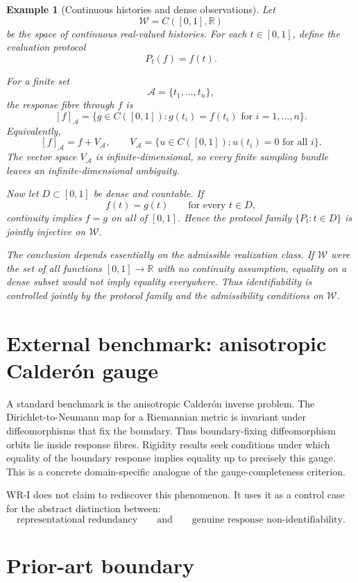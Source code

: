 \documentclass[11pt]{article}
\newtheorem{example}[definition]{Example}
\newcommand{\W}{\mathcal W}
\newcommand{\Acal}{\mathcal A}
\begin{document}
\begin{example}[Continuous histories and dense observations]
Let
\[
\W=C([0,1],\mathbb R)
\]
be the space of continuous real-valued histories.  For each $t\in[0,1]$, define
the evaluation protocol
\[
P_t(f)=f(t).
\]

For a finite set
\[
\Acal=\{t_1,\dots,t_n\},
\]
the response fibre through $f$ is
\[
[f]_{\Acal}
=
\{g\in C([0,1]):g(t_i)=f(t_i)\text{ for }i=1,\dots,n\}.
\]
Equivalently,
\[
[f]_{\Acal}
=
f+V_{\Acal},
\qquad
V_{\Acal}
=
\{u\in C([0,1]):u(t_i)=0\text{ for all }i\}.
\]
The vector space $V_{\Acal}$ is infinite-dimensional, so every finite sampling
bundle leaves an infinite-dimensional ambiguity.

Now let $D\subset[0,1]$ be dense and countable.  If
\[
f(t)=g(t)\qquad\text{for every }t\in D,
\]
continuity implies $f=g$ on all of $[0,1]$.  Hence the protocol family
$\{P_t:t\in D\}$ is jointly injective on $\W$.

The conclusion depends essentially on the admissible realization class.  If
$\W$ were the set of all functions $[0,1]\to\mathbb R$ with no continuity
assumption, equality on a dense subset would not imply equality everywhere.
Thus identifiability is controlled jointly by the protocol family and the
admissibility conditions on $\W$.
\end{example}

\section{External benchmark: anisotropic Calderón gauge}

A standard benchmark is the anisotropic Calderón inverse problem.  The
Dirichlet-to-Neumann map for a Riemannian metric is invariant under
diffeomorphisms that fix the boundary.  Thus boundary-fixing diffeomorphism
orbits lie inside response fibres.  Rigidity results seek conditions under which
equality of the boundary response implies equality up to precisely this gauge.
This is a concrete domain-specific analogue of the gauge-completeness criterion.

WR-I does not claim to rediscover this phenomenon.  It uses it as a control case
for the abstract distinction between:
\[
\text{representational redundancy}
\qquad\text{and}\qquad
\text{genuine response non-identifiability}.
\]

\section{Prior-art boundary}
\end{document}
